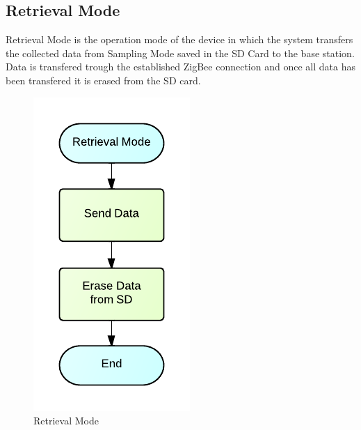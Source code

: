 \subsection{Retrieval Mode}
Retrieval Mode is the operation mode of the device in which the system transfers the collected data from Sampling Mode saved in the SD Card to the base station. Data is transfered trough the established ZigBee connection and once all data has been transfered it is erased from the SD card.
\begin{figure}[H]
	\centering
	\includegraphics[scale=1.0]{img/RetrievalMode}
	\caption{Retrieval Mode \label{fig:retrivalMode}}
\end{figure}



